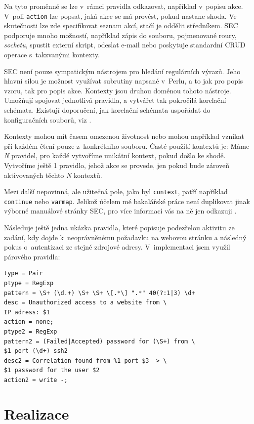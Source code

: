 \documentclass[thesis=B,czech]{FITthesis}[2012/06/26]
\begin{document}
Na tyto proměnné se lze v~rámci pravidla odkazovat, například v~popisu akce. V~poli \texttt{action} lze popsat, jaká akce se má provést, pokud nastane shoda. Ve skutečnosti lze zde specifikovat seznam akcí, stačí je oddělit středníkem. SEC podporuje mnoho možností, například zápis do souboru, pojmenované roury, \textit{socketu}, spustit externí skript, odeslat e-mail nebo poskytuje standardní CRUD operace s~takzvanými kontexty. \cite{secManPage}

SEC není pouze sympatickým nástrojem pro hledání regulárních výrazů. Jeho hlavní silou je možnost využívat subrutiny napsané v~Perlu, a to jak pro popis vzoru, tak pro popis akce. Kontexty jsou druhou doménou tohoto nástroje. Umožňují spojovat jednotlivá pravidla, a vytvářet tak pokročilá korelační schémata. Existují doporučení, jak korelační schémata uspořádat do konfiguračních souborů, viz \cite{secBestPractices}.

Kontexty mohou mít časem omezenou životnost nebo mohou například vznikat při každém čtení pouze z~konkrétního souboru. Časté použití kontextů je: Máme \textit{N} pravidel, pro každé vytvoříme unikátní kontext, pokud došlo ke shodě. Vytvoříme ještě 1 pravidlo, jehož akce se provede, jen pokud bude zároveň aktivovaných těchto \textit{N} kontextů. \cite{secManPage}

Mezi další nepovinná, ale užitečná pole, jako byl \texttt{context}, patří například \texttt{continue} nebo \texttt{varmap}. Jelikož účelem mé bakalářské práce není duplikovat jinak výborné manuálové stránky SEC, pro více informací vás na ně jen odkazuji \cite{secManPage}.

Následuje ještě jedna ukázka pravidla, které popisuje podezřelou aktivitu ze zadání, kdy dojde k~neoprávněnému požadavku na webovou stránku a následný pokus o~autentizaci ze stejné zdrojové adresy. V~implementaci jsem využil párového pravidla:
\newpage
\begin{lstlisting}[frame=single,caption=Ukázka pravidla typu Pair,label=examplePair]
type = Pair
ptype = RegExp
pattern = \S+ (\d.+) \S+ \S+ \[.*\] ".*" 40(?:1|3) \d+
desc = Unauthorized access to a website from \ 
IP adress: $1
action = none;
ptype2 = RegExp
pattern2 = (Failed|Accepted) password for (\S+) from \
$1 port (\d+) ssh2
desc2 = Correlation found from %1 port $3 -> \ 
$1 password for the user $2
action2 = write -;
\end{lstlisting}

\chapter{Realizace}
\end{document}
